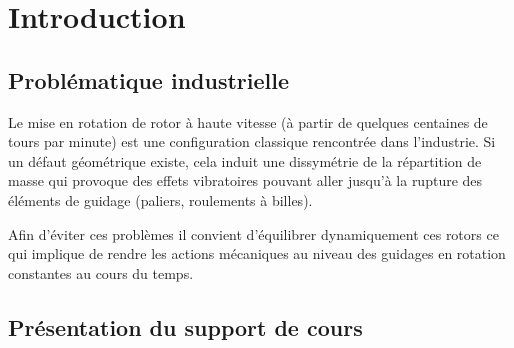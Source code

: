 \documentclass[10pt,fleqn]{article} %
\begin{document}

\setlength{\columnseprule}{.1pt}

\vspace{2cm}
\pagestyle{fancy}
\thispagestyle{plain}




\section{Introduction}
\subsection{Problématique industrielle}

Le mise en rotation de rotor à haute vitesse (à partir de quelques centaines de tours par minute) est une configuration classique rencontrée dans l'industrie. Si un défaut géométrique existe, cela induit une dissymétrie de la répartition de masse qui provoque des effets vibratoires pouvant aller jusqu'à la rupture des éléments de guidage (paliers, roulements à billes).

Afin d'éviter ces problèmes il convient d'équilibrer dynamiquement ces rotors ce qui implique de rendre les actions mécaniques au niveau des guidages en rotation constantes au cours du temps.
%

\subsection{Présentation du support de cours}
\end{document}
